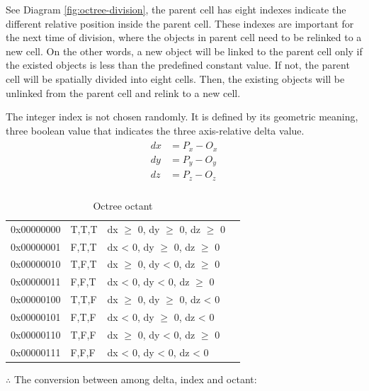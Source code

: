 See Diagram \ref{fig:octree-division}, the parent cell has eight indexes indicate the different relative position inside the parent cell. These indexes are important for the next time of division, where the objects in parent cell need to be relinked to a new cell. On the other words, a new object will be linked to the parent cell only if the existed objects is less than the predefined constant value. If not, the parent cell will be spatially divided into eight cells. Then, the existing objects will be unlinked from the parent cell and relink to a new cell.

The integer index is not chosen randomly. It is defined by its geometric meaning, three boolean value that indicates the three axis-relative delta value.
\[
\begin{array}{lr}
\begin{aligned}
dx &= P_x - O_x\\
dy &= P_y - O_y\\
dz &= P_z - O_z\\
\end{aligned}
\end{array}
\]

\begin{table}[H]
\caption{Octree octant}
\label{tab:octree-octant}
\centering
	\begin{tabular}{l l l l}
	\toprule
	\tabhead{Binary Index} & \tabhead{Octant} & \tabhead{Geometric Meaning}\\
	\midrule
	0x00000000 & T,\;T,\;T & dx $\geqslant$ 0, dy $\geqslant$ 0, dz $\geqslant$ 0\\
	0x00000001 & F,\;T,\;T & dx < 0, dy $\geqslant$ 0, dz $\geqslant$ 0\\
	0x00000010 & T,\;F,\;T & dx $\geqslant$ 0, dy < 0, dz $\geqslant$ 0\\
	0x00000011 & F,\;F,\;T & dx < 0, dy < 0, dz $\geqslant$ 0\\
	0x00000100 & T,\;T,\;F & dx $\geqslant$ 0, dy $\geqslant$ 0, dz < 0\\
	0x00000101 & F,\;T,\;F & dx < 0, dy $\geqslant$ 0, dz < 0\\
	0x00000110 & T,\;F,\;F & dx $\geqslant$ 0, dy < 0, dz $\geqslant$ 0\\
	0x00000111 & F,\;F,\;F & dx < 0, dy < 0, dz < 0\\
	\bottomrule
	\end{tabular}
\end{table}

$\therefore$ The conversion between among delta, index and octant:

